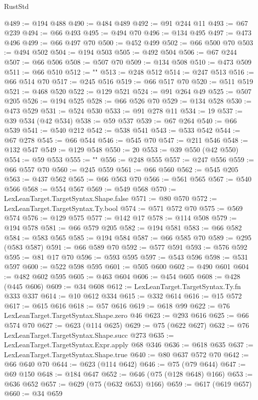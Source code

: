 \begin{lexlean}{RustStd}
\begin{coremodule}
@489 := @194 @488
@490 := @484 @489
@492 := @91 @244 @11
@493 := @67 @239
@494 := @66 @493
@495 := @494 @70
@496 := @134 @495
@497 := @473 @496
@499 := @66 @497 @70
@500 := @452 @499
@502 := @66 @500 @70
@503 := @494 @502
@504 := @194 @503
@505 := @492 @504
@506 := @67 @244
@507 := @66 @506
@508 := @507 @70
@509 := @134 @508
@510 := @473 @509
@511 := @66 @510
@512 := "{"
@513 := @248 @512
@514 := @247 @513
@516 := @66 @514 @70
@517 := @245 @516
@519 := @66 @517 @70
@520 := @511 @519
@521 := @468 @520
@522 := @129 @521
@524 := @91 @264 @49
@525 := @507 @205
@526 := @194 @525
@528 := @66 @526 @70
@529 := @134 @528
@530 := @473 @529
@531 := @524 @530
@533 := @91 @278 @11
@534 := 19
@537 := @39 @534 (@42 @534)
@538 := @59 @537
@539 := @67 @264
@540 := @66 @539
@541 := @540 @212
@542 := @538 @541
@543 := @533 @542
@544 := @67 @278
@545 := @66 @544
@546 := @545 @70
@547 := @211 @546
@548 := @132 @547
@549 := @129 @548
@550 := 20
@553 := @39 @550 (@42 @550)
@554 := @59 @553
@555 := "}"
@556 := @248 @555
@557 := @247 @556
@559 := @66 @557 @70
@560 := @245 @559
@561 := @66 @560
@562 := @545 @205
@563 := @437 @562
@565 := @66 @563 @70
@566 := @561 @565
@567 := @540 @566
@568 := @554 @567
@569 := @549 @568
@570 := LexLeanTarget.TargetSyntax.Shape.false
@571 := @80 @570
@572 := LexLeanTarget.TargetSyntax.Ty.bool
@574 := @571 @572 @70
@575 := @569 @574
@576 := @129 @575
@577 := @142 @17
@578 := @114 @508
@579 := @194 @578
@581 := @66 @579 @205
@582 := @194 @581
@583 := @66 @582
@584 := @583 @565
@585 := @194 @584
@587 := @66 @585 @70
@589 := @295 (@583 @587)
@591 := @66 @589 @70
@592 := @577 @591
@593 := @576 @592
@595 := @81 @17 @70
@596 := @593 @595
@597 := @543 @596
@598 := @531 @597
@600 := @522 @598 @595
@601 := @505 @600
@602 := @490 @601
@604 := @482 @602 @595
@605 := @463 @604
@606 := @454 @605
@608 := @428 (@445 @606)
@609 := @34 @608
@612 := LexLeanTarget.TargetSyntax.Ty.fn @333 @337
@614 := @10 @612 @334
@615 := @332 @614
@616 := @15 @572
@617 := @615 @616
@618 := @57 @616
@619 := @618 @99
@622 := @76 LexLeanTarget.TargetSyntax.Shape.zero @46
@623 := @293 @616
@625 := @66 @574 @70
@627 := @623 (@114 @625)
@629 := @75 (@622 @627)
@632 := @76 LexLeanTarget.TargetSyntax.Shape.succ @273
@635 := LexLeanTarget.TargetSyntax.Expr.apply @68 @346
@636 := @618 @635
@637 := LexLeanTarget.TargetSyntax.Shape.true
@640 := @80 @637 @572 @70
@642 := @66 @640 @70
@644 := @623 (@114 @642)
@646 := @75 (@79 @644)
@647 := @69 @150
@648 := @184 @647
@652 := @646 (@75 (@128 @648) @166)
@653 := @636 @652
@657 := @629 (@75 (@632 @653) @166)
@659 := @617 (@619 @657)
@660 := @34 @659

\end{coremodule}
\end{lexlean}
